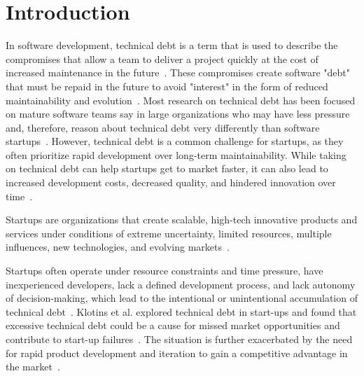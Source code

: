
\section{Introduction}
In software development, technical debt is a term that is used to describe the compromises that allow a team to deliver a project quickly at the cost of increased maintenance in the future~\cite{Maldonado7332619}.
These compromises create software "debt" that must be repaid in the future to  avoid "interest" in the form of reduced maintainability and evolution~\cite{Seaman6225999}.
Most research on technical debt has been focused on mature software teams say in large organizations who may have less pressure and, therefore, reason about technical debt very differently than software startups~\cite{Besker2018,Li:2015}.
However, technical debt is a common challenge for startups, as they often prioritize rapid development over long-term maintainability.
While taking on technical debt can help startups get to market faster, it can also lead to increased development costs, decreased quality, and hindered innovation over time~\cite{Seaman6225999, DesignSt86:online}.

Startups are organizations that create scalable, high-tech innovative products and services under conditions of extreme uncertainty, limited resources, multiple influences, new technologies, and evolving markets~\cite{Unterkalmsteiner16}. %

Startups often operate under resource constraints and time pressure, have inexperienced developers, lack a defined development process, and lack autonomy of decision-making, which lead to the intentional or unintentional accumulation of technical debt~\cite{Besker2018}.
Klotins et al. explored technical debt in start-ups and found that excessive technical debt could be a cause for missed market opportunities and contribute to start-up failures~\cite{Klotins:2018:ETD}.
The situation is further exacerbated by the need for rapid product development and iteration to gain a competitive advantage in the market~\cite{Cico0JNM20}.

